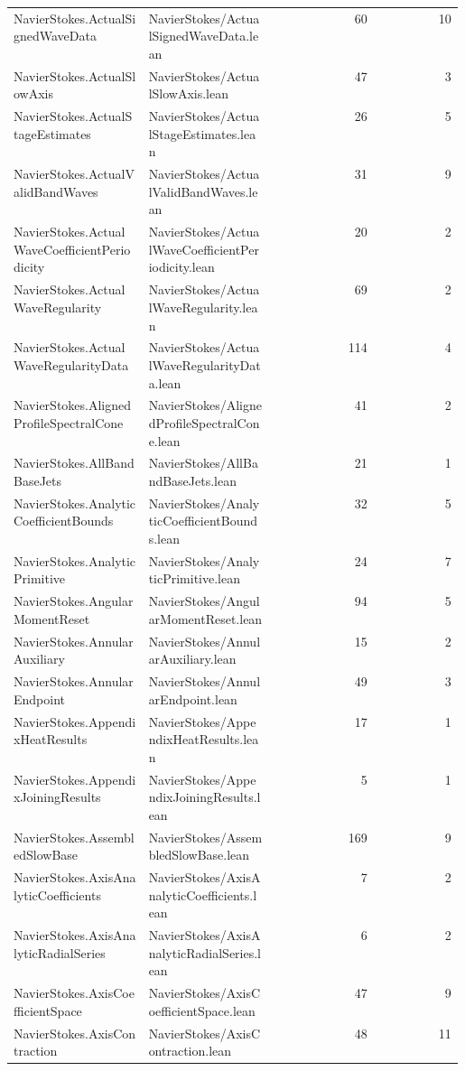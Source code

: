 \begin{longtable}{p{0.30\linewidth}p{0.28\linewidth}rr}
NavierStokes.ActualSignedWaveData & NavierStokes/ActualSignedWaveData.lean & 60 & 10\\
NavierStokes.ActualSlowAxis & NavierStokes/ActualSlowAxis.lean & 47 & 3\\
NavierStokes.ActualStageEstimates & NavierStokes/ActualStageEstimates.lean & 26 & 5\\
NavierStokes.ActualValidBandWaves & NavierStokes/ActualValidBandWaves.lean & 31 & 9\\
NavierStokes.ActualWaveCoefficientPeriodicity & NavierStokes/ActualWaveCoefficientPeriodicity.lean & 20 & 2\\
NavierStokes.ActualWaveRegularity & NavierStokes/ActualWaveRegularity.lean & 69 & 2\\
NavierStokes.ActualWaveRegularityData & NavierStokes/ActualWaveRegularityData.lean & 114 & 4\\
NavierStokes.AlignedProfileSpectralCone & NavierStokes/AlignedProfileSpectralCone.lean & 41 & 2\\
NavierStokes.AllBandBaseJets & NavierStokes/AllBandBaseJets.lean & 21 & 1\\
NavierStokes.AnalyticCoefficientBounds & NavierStokes/AnalyticCoefficientBounds.lean & 32 & 5\\
NavierStokes.AnalyticPrimitive & NavierStokes/AnalyticPrimitive.lean & 24 & 7\\
NavierStokes.AngularMomentReset & NavierStokes/AngularMomentReset.lean & 94 & 5\\
NavierStokes.AnnularAuxiliary & NavierStokes/AnnularAuxiliary.lean & 15 & 2\\
NavierStokes.AnnularEndpoint & NavierStokes/AnnularEndpoint.lean & 49 & 3\\
NavierStokes.AppendixHeatResults & NavierStokes/AppendixHeatResults.lean & 17 & 1\\
NavierStokes.AppendixJoiningResults & NavierStokes/AppendixJoiningResults.lean & 5 & 1\\
NavierStokes.AssembledSlowBase & NavierStokes/AssembledSlowBase.lean & 169 & 9\\
NavierStokes.AxisAnalyticCoefficients & NavierStokes/AxisAnalyticCoefficients.lean & 7 & 2\\
NavierStokes.AxisAnalyticRadialSeries & NavierStokes/AxisAnalyticRadialSeries.lean & 6 & 2\\
NavierStokes.AxisCoefficientSpace & NavierStokes/AxisCoefficientSpace.lean & 47 & 9\\
NavierStokes.AxisContraction & NavierStokes/AxisContraction.lean & 48 & 11\\

\end{longtable}
